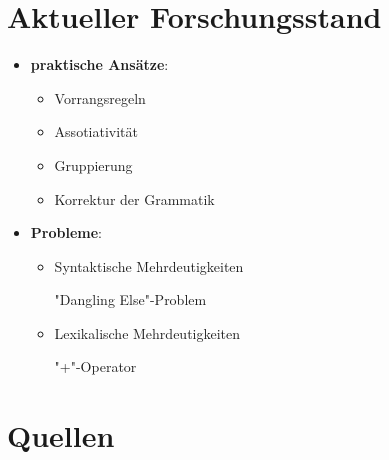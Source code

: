 \documentclass[t]{beamer}
\begin{document}
\section{Aktueller Forschungsstand}
\begin{frame}
\centering
\vspace{20pt}
    \begin{itemize}
        \setlength\itemsep{1em} %
        \item \textbf{praktische Ansätze}:
        \begin{itemize}
            \setlength\itemsep{0.8em} %
            \item Vorrangsregeln \cite{thorup1994}
            \item Assotiativität
            \item Gruppierung
            \item Korrektur der Grammatik \cite{watrous2020}
        \end{itemize}
        
        \vspace{10pt}
        
        \item \textbf{Probleme}:
        \begin{itemize}
            \setlength\itemsep{0.8em} %
            \item Syntaktische Mehrdeutigkeiten \par
            "Dangling Else"-Problem
            \item Lexikalische Mehrdeutigkeiten \par
            "+"-Operator
        \end{itemize}
    \end{itemize}
\end{frame}


\section{Quellen}
\begin{frame}[allowframebreaks]


\end{frame}
\end{document}
